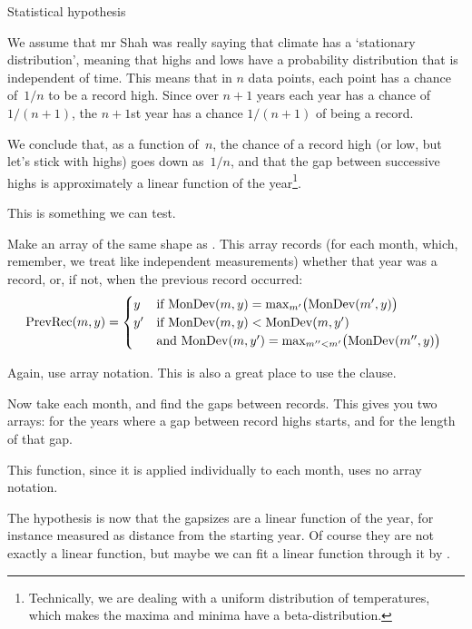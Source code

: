  {Statistical hypothesis}

We assume that mr Shah was really saying that climate has a
`stationary distribution', meaning that highs and lows have a
probability distribution that is independent of time.
This means that in $n$ data points, each point has a chance
of~$1/n$ to be a record high. Since over $n+1$ years each year has a
chance of $1/(n+1)$, the $n+1$st year has a chance $1/(n+1)$ of being a
record.

We conclude that, as a function
of~$n$, the chance of a record high (or low, but let's stick with
highs) goes down as~$1/n$, and that the gap between successive highs
is approximately a linear function of the year\footnote {Technically,
  we are dealing with a uniform distribution of temperatures, which
  makes the maxima and minima have a beta-distribution.}.

This is something we can test.

\begin{exercise}
  Make an array  of the same shape as
  . This array records (for each month, which,
  remember, we treat like independent measurements) whether
  that year was a record, or, if not, when the previous record
  occurred:
  \[ \mathrm{PrevRec}(m,y) = 
  \begin{cases}
    y&\hbox{if
      $\mathrm{MonDev}(m,y) = \max_{m'} \bigl( \mathrm{MonDev}(m',y)\bigr)$
    }\\
    y'&\hbox{if
      $\mathrm{MonDev}(m,y) < \mathrm{MonDev}(m,y')$ }\\
      &\hbox{and
      $\mathrm{MonDev}(m,y') = \max_{m''<m'}\bigl( \mathrm{MonDev}(m'',y)\bigr)$
    }\\
  \end{cases}
  \]

  Again, use array notation. This is also a great place to use the
   clause.
\end{exercise}

\begin{exercise}
  Now take each month, and find the gaps between records. This gives
  you two arrays:  for the years where a gap between
  record highs starts, and  for the length of that gap.

  This function, since it is applied individually to each month, uses
  no array notation.
\end{exercise}

The hypothesis is now that the gapsizes are a linear function of the
year, for instance measured as distance from the starting year. Of
course they are not exactly a linear function, but maybe we can fit a
linear function through it by .

